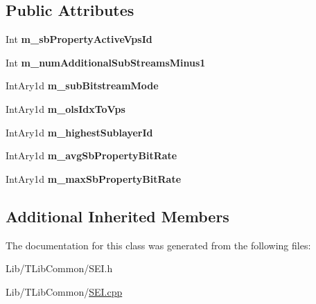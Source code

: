 \subsection*{Public Attributes}
\begin{DoxyCompactItemize}
\item 
\mbox{\label{class_s_e_i_sub_bitstream_property_a203dd04f06ccdb3167f2835c84b8ad0b}} 
Int {\bfseries m\+\_\+sb\+Property\+Active\+Vps\+Id}
\item 
\mbox{\label{class_s_e_i_sub_bitstream_property_a01d4554a62fed27b55cb714cff0ee4d8}} 
Int {\bfseries m\+\_\+num\+Additional\+Sub\+Streams\+Minus1}
\item 
\mbox{\label{class_s_e_i_sub_bitstream_property_a0ac327d0a7dfc5c6d236ff7dd527e0d3}} 
Int\+Ary1d {\bfseries m\+\_\+sub\+Bitstream\+Mode}
\item 
\mbox{\label{class_s_e_i_sub_bitstream_property_a22250830a8139ce38cb2160de960f802}} 
Int\+Ary1d {\bfseries m\+\_\+ols\+Idx\+To\+Vps}
\item 
\mbox{\label{class_s_e_i_sub_bitstream_property_ad323b5bc289cd483e6c5b19ea368efef}} 
Int\+Ary1d {\bfseries m\+\_\+highest\+Sublayer\+Id}
\item 
\mbox{\label{class_s_e_i_sub_bitstream_property_a132f70b8283e0a42912342063cf5c383}} 
Int\+Ary1d {\bfseries m\+\_\+avg\+Sb\+Property\+Bit\+Rate}
\item 
\mbox{\label{class_s_e_i_sub_bitstream_property_ab042a71fafa7987fc9b9422c41d93bbc}} 
Int\+Ary1d {\bfseries m\+\_\+max\+Sb\+Property\+Bit\+Rate}
\end{DoxyCompactItemize}
\subsection*{Additional Inherited Members}


The documentation for this class was generated from the following files\+:\begin{DoxyCompactItemize}
\item 
Lib/\+T\+Lib\+Common/S\+E\+I.\+h\item 
Lib/\+T\+Lib\+Common/\hyperlink{_s_e_i_8cpp}{S\+E\+I.\+cpp}\end{DoxyCompactItemize}

